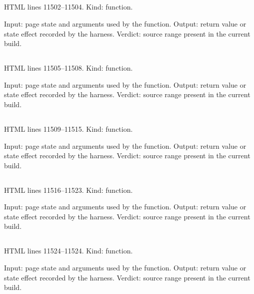 \subsection*{\texttt{}}
\label{vf_637_cmdStatusLine}
HTML lines 11502--11504. Kind: function.

Input: page state and arguments used by the function.
Output: return value or state effect recorded by the harness.
Verdict: source range present in the current build.

\subsection*{\texttt{}}
\label{vf_638_selOptionRule}
HTML lines 11505--11508. Kind: function.

Input: page state and arguments used by the function.
Output: return value or state effect recorded by the harness.
Verdict: source range present in the current build.

\subsection*{\texttt{}}
\label{vf_639_selValidateOption}
HTML lines 11509--11515. Kind: function.

Input: page state and arguments used by the function.
Output: return value or state effect recorded by the harness.
Verdict: source range present in the current build.

\subsection*{\texttt{}}
\label{vf_640_selParseCommand}
HTML lines 11516--11523. Kind: function.

Input: page state and arguments used by the function.
Output: return value or state effect recorded by the harness.
Verdict: source range present in the current build.

\subsection*{\texttt{}}
\label{vf_641_selApplyOptions}
HTML lines 11524--11524. Kind: function.

Input: page state and arguments used by the function.
Output: return value or state effect recorded by the harness.
Verdict: source range present in the current build.

